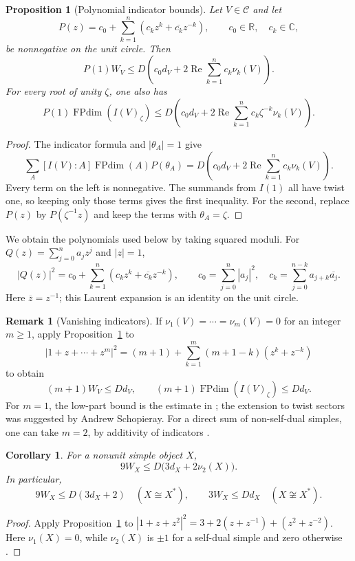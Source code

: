 \documentclass[11pt]{amsart}
\newtheorem{proposition}[theorem]{Proposition}
\newtheorem{corollary}[theorem]{Corollary}
\theoremstyle{definition}
\newtheorem{remark}[theorem]{Remark}
\DeclareMathOperator{\FPdim}{FPdim}
\newcommand{\C}{\mathbb C}
\numberwithin{equation}{section}
\begin{document}
\begin{proposition}[Polynomial indicator bounds]\label{lem:indicator-polynomials}
Let $V\in\mathcal C$ and let
\[
 P(z)=c_0+\sum_{k=1}^n(c_kz^k+\overline{c_k}z^{-k}),
 \qquad c_0\in\mathbb R,\quad c_k\in\C,
\]
be nonnegative on the unit circle. Then
\[
 P(1)W_V\leq D\left(c_0d_V+
                    2\operatorname{Re}\sum_{k=1}^n c_k\nu_k(V)\right).
\]
For every root of unity $\zeta$, one also has
\[
 P(1)\FPdim(I(V)_\zeta)
 \leq D\left(c_0d_V+
       2\operatorname{Re}\sum_{k=1}^n c_k\zeta^{-k}\nu_k(V)\right).
\]
\end{proposition}
\begin{proof}
The indicator formula and $|\theta_A|=1$ give
\[
 \sum_A[I(V):A]\FPdim(A)P(\theta_A)
 =D\left(c_0d_V+2\operatorname{Re}\sum_{k=1}^n c_k\nu_k(V)\right).
\]
Every term on the left is nonnegative. The summands from $I(1)$ all
have twist one, so keeping only those terms gives the first inequality.
For the second, replace $P(z)$ by $P(\zeta^{-1}z)$ and keep the terms
with $\theta_A=\zeta$.
\end{proof}

We obtain the polynomials used below by taking squared moduli.
For $Q(z)=\sum_{j=0}^n a_jz^j$ and $|z|=1$,
\[
 |Q(z)|^2=c_0+\sum_{k=1}^n(c_kz^k+\overline{c_k}z^{-k}),\qquad
 c_0=\sum_{j=0}^n|a_j|^2,\quad
 c_k=\sum_{j=0}^{n-k}a_{j+k}\overline{a_j}.
\]
Here $\overline z=z^{-1}$; this Laurent expansion is an identity on
the unit circle.

\begin{remark}[Vanishing indicators]\label{rem:vanishing-indicators}
If $\nu_1(V)=\cdots=\nu_m(V)=0$ for an integer $m\geq1$, apply
Proposition~\ref{lem:indicator-polynomials} to
\[
 |1+z+\cdots+z^m|^2
 =(m+1)+\sum_{k=1}^m(m+1-k)(z^k+z^{-k})
\]
to obtain
\[
 (m+1)W_V\leq Dd_V,\qquad
 (m+1)\FPdim(I(V)_\zeta)\leq Dd_V.
\]
For $m=1$, the low-part bound is the estimate in
\cite[proof of Theorem~2.21]{OstrikRank3}; the extension to twist
sectors was suggested by Andrew Schopieray. For a direct sum of
non-self-dual simples, one can take $m=2$, by additivity of indicators
\cite[Corollary~7.8]{NgSchauenburgHigher}.
\end{remark}

\begin{corollary}\label{cor:second-indicator}
For a nonunit simple object $X$,
\[
 9W_X\leq D\bigl(3d_X+2\nu_2(X)\bigr).
\]
In particular,
\[
 9W_X\leq D(3d_X+2)\quad(X\cong X^*),\qquad
 3W_X\leq Dd_X\quad(X\not\cong X^*).
\]
\end{corollary}
\begin{proof}
Apply Proposition~\ref{lem:indicator-polynomials} to
$|1+z+z^2|^2=3+2(z+z^{-1})+(z^2+z^{-2})$.
Here $\nu_1(X)=0$, while $\nu_2(X)$ is $\pm1$ for a self-dual simple
and zero otherwise \cite[Definition~3.1 and Theorem~5.1]{NgSchauenburgHigher}.
\end{proof}
\end{document}

